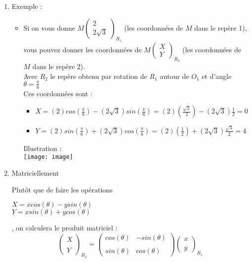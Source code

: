\documentclass[11]{article}
\newcommand\coordo[2]{\begin{pmatrix} #1 \\#2 \end{pmatrix}}
\begin{document}
\begin{enumerate}
\begin{enumerate}
\newpage

\item Exemple :  \\

\begin{itemize}
\item Si on vous donne $M\coordo{2}{2\sqrt{3}}_{R_1}$ (les coordonnées de $M$ dans le repère 1), vous pouvez donner les coordonnées de $M\coordo{X}{Y}_{R_2}$ (les coordonnées de $M$ dans le repère 2). \\ Avec $R_2$ le repère obtenu par rotation de $R_1$ autour de $O_1$ et d'angle $\theta=\frac{\pi}{6}$ \\

Ces coordonnées sont : 
\begin{itemize}
\item $X = (2)cos(\frac{\pi}{6})-(2\sqrt{3})sin(\frac{\pi}{6}) = (2)(\frac{\sqrt{3}}{2})-(2\sqrt{3})\frac{1}{2}=0$ 
\item $Y = (2)sin(\frac{\pi}{6})+(2\sqrt{3})cos(\frac{\pi}{6}) = (2)(\frac{1}{2})+(2\sqrt{3})\frac{\sqrt{3}}{2}=4$ 
\end{itemize} 
\vspace{1\baselineskip}

Illustration : \\
\texttt{[image: image]} \\
\end{itemize}


\item Matriciellement 

Plutôt que de faire les opérations \begin{minipage}{13em} $X=x cos(\theta) - y sin(\theta)$ \\ $Y=x sin(\theta) + y cos(\theta)$ \end{minipage}, on calculera le produit matriciel : 
$$\begin{pmatrix}
X \\ \\
Y
\end{pmatrix}_{R_2}   = 
\begin{pmatrix}
cos(\theta) & -sin(\theta) \\ \\
sin(\theta) & cos(\theta)
\end{pmatrix} \begin{pmatrix}
x \\ \\
y\end{pmatrix}_{R_1}
$$


\end{enumerate}
\end{enumerate}
\end{document}
